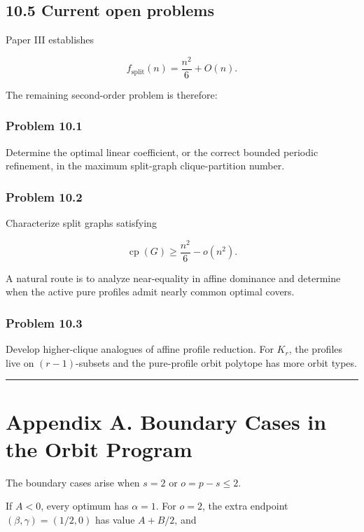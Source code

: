 \documentclass[11pt,a4paper]{article}
\begin{document}
\subsection{10.5 Current open problems}\label{current-open-problems}

Paper III establishes

\[
f_{\mathrm{split}}(n)=\frac{n^2}{6}+O(n).
\]

The remaining second-order problem is therefore:

\subsubsection{Problem 10.1}\label{problem-10.1}

Determine the optimal linear coefficient, or the correct bounded periodic refinement, in the maximum split-graph clique-partition number.

\subsubsection{Problem 10.2}\label{problem-10.2}

Characterize split graphs satisfying

\[
\operatorname{cp}(G)\ge\frac{n^2}{6}-o(n^2).
\]

A natural route is to analyze near-equality in affine dominance and determine when the active pure profiles admit nearly common optimal covers.

\subsubsection{Problem 10.3}\label{problem-10.3}

Develop higher-clique analogues of affine profile reduction. For \(K_r\), the profiles live on \((r-1)\)-subsets and the pure-profile orbit polytope has more orbit types.

\begin{center}\rule{0.5\linewidth}{0.5pt}\end{center}

\section{Appendix A. Boundary Cases in the Orbit Program}\label{appendix-a.-boundary-cases-in-the-orbit-program}

The boundary cases arise when \(s=2\) or \(o=p-s\le2\).

If \(A<0\), every optimum has \(\alpha=1\). For \(o=2\), the extra endpoint \((\beta,\gamma)=(1/2,0)\) has value \(A+B/2\), and
\end{document}
